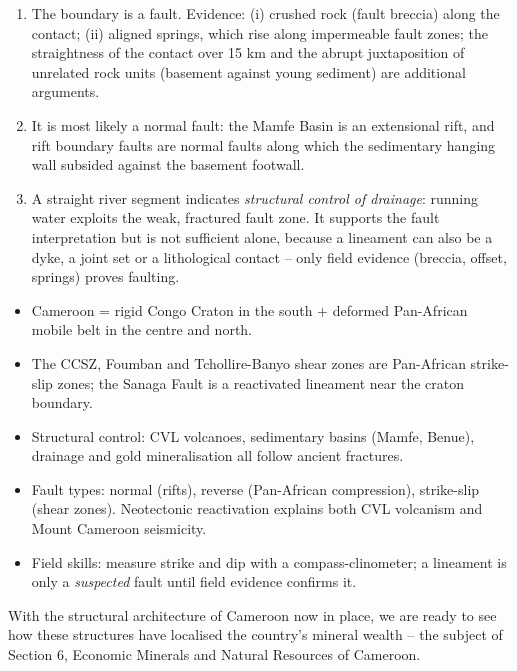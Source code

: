 \documentclass[11pt]{article}
\newcommand{\cle}[1]{{\popxbold\color{popdark}#1}}
\begin{document}
\begin{corrige}
\begin{enumerate}
\item The boundary is a \cle{fault}. Evidence: (i) crushed rock (fault breccia) along the contact; (ii) aligned springs, which rise along impermeable fault zones; the straightness of the contact over 15 km and the abrupt juxtaposition of unrelated rock units (basement against young sediment) are additional arguments.
\item It is most likely a \cle{normal fault}: the Mamfe Basin is an extensional rift, and rift boundary faults are normal faults along which the sedimentary hanging wall subsided against the basement footwall.
\item A straight river segment indicates \emph{structural control of drainage}: running water exploits the weak, fractured fault zone. It supports the fault interpretation but is not sufficient alone, because a lineament can also be a dyke, a joint set or a lithological contact -- only field evidence (breccia, offset, springs) proves faulting.
\end{enumerate}
\end{corrige}

\begin{aretenir}
\begin{itemize}
\item Cameroon = rigid \cle{Congo Craton} in the south $+$ deformed \cle{Pan-African mobile belt} in the centre and north.
\item The \cle{CCSZ}, Foumban and Tchollire-Banyo shear zones are Pan-African strike-slip zones; the \cle{Sanaga Fault} is a reactivated lineament near the craton boundary.
\item \cle{Structural control}: CVL volcanoes, sedimentary basins (Mamfe, Benue), drainage and gold mineralisation all follow ancient fractures.
\item Fault types: \cle{normal} (rifts), \cle{reverse} (Pan-African compression), \cle{strike-slip} (shear zones). Neotectonic reactivation explains both CVL volcanism and Mount Cameroon seismicity.
\item Field skills: measure \cle{strike and dip} with a compass-clinometer; a lineament is only a \emph{suspected} fault until field evidence confirms it.
\end{itemize}
\end{aretenir}

With the structural architecture of Cameroon now in place, we are ready to see how these structures have localised the country's mineral wealth -- the subject of Section 6, Economic Minerals and Natural Resources of Cameroon.
\end{document}
